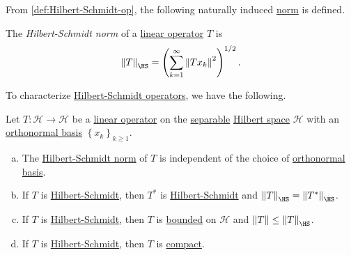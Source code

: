 From \autoref{def:Hilbert-Schmidt-op}, the following naturally induced \hyperref[def:norm]{norm} is defined.

\begin{definition}\label{def:Hilbert-Schmidt-norm}
	The \emph{Hilbert-Schmidt norm} of a \hyperref[def:linear-map]{linear operator} \(T\) is
	\[
		\left\lVert T\right\rVert _{\HS } = \left( \sum_{k=1}^{\infty} \left\lVert T x_{k} \right\rVert ^2 \right) ^{1 / 2}.
	\]
\end{definition}

To characterize \hyperref[def:Hilbert-Schmidt-op]{Hilbert-Schmidt operators}, we have the following.

\begin{proposition}
	Let \(T\colon \mathcal{H} \to \mathcal{H} \) be a \hyperref[def:linear-op]{linear operator} on the \hyperref[def:separable]{separable} \hyperref[def:Hilbert-space]{Hilbert space} \(\mathcal{H} \) with an \hyperref[def:orthonormal-basis]{orthonormal basis} \(\left\{ x_k \right\}_{k\geq 1} \).
	\begin{enumerate}[(a)]
		\item The \hyperref[def:Hilbert-Schmidt-norm]{Hilbert-Schmidt norm} of \(T\) is independent of the choice of \hyperref[def:orthonormal-basis]{orthonormal basis}.
		\item If \(T\) is \hyperref[def:Hilbert-Schmidt-op]{Hilbert-Schmidt}, then \(T^{\ast} \) is \hyperref[def:Hilbert-Schmidt-op]{Hilbert-Schmidt} and \(\left\lVert T\right\rVert _{\HS } = \left\lVert T^{\ast} \right\rVert _{\HS } \).
		\item If \(T\) is \hyperref[def:Hilbert-Schmidt-op]{Hilbert-Schmidt}, then \(T\) is \hyperref[def:bounded-linear-op]{bounded} on \(\mathcal{H} \) and \(\left\lVert T\right\rVert \leq \left\lVert T\right\rVert _{\HS }\).
		\item If \(T\) is \hyperref[def:Hilbert-Schmidt-op]{Hilbert-Schmidt}, then \(T\) is \hyperref[def:compact-op]{compact}.
	\end{enumerate}
\end{proposition}
